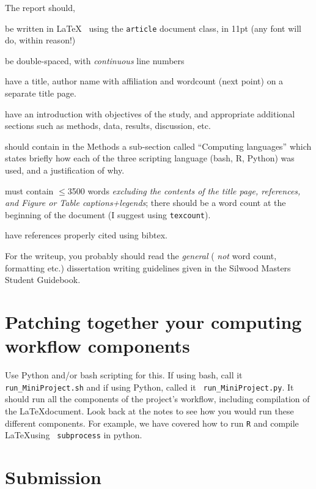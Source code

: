 	The report should,
	\begin{compactitem}
		\item be written in \LaTeX~ using the {\tt article} document class, 
		in 11pt (any font will do, within reason!)
	
		\item be double-spaced, with {\it continuous} line numbers 
	
		\item have a title, author name with affiliation and wordcount 
		(next point) on a separate title page.
		
		\item have an introduction with objectives of the study, and 
		appropriate additional sections such as methods, data, results, 
		discussion, etc. 
		\item should contain in the Methods a sub-section called 
		``Computing languages'' which states briefly how each of the three 
		scripting language (bash, R, Python) was used, and a justification 
		of why. 
		\item must contain $\leq$3500 words {\it excluding the contents of 
		the title page, references, and Figure or Table captions+legends}; 
		there should be a word count at the beginning of the document (I 
		suggest using {\tt texcount}).
	
		\item have references properly cited using bibtex.
	
	\end{compactitem}

For the writeup, you probably should read the {\it general} ( {\it 
not} word count, formatting etc.) dissertation writing guidelines given 
in the Silwood Masters Student Guidebook.  

\section{Patching together your computing workflow components}

Use Python and/or bash scripting for this. If using bash, call it  {\tt 
run\_MiniProject.sh} and if using Python, called it {\tt 
run\_MiniProject.py}. It should run all the components of the project's 
workflow, including compilation of the \LaTeX document. Look back at 
the notes to see how you would run these different components. For 
example, we have covered how to run {\tt R} and compile \LaTeX using {\tt 
subprocess} in python.

\section{Submission}

